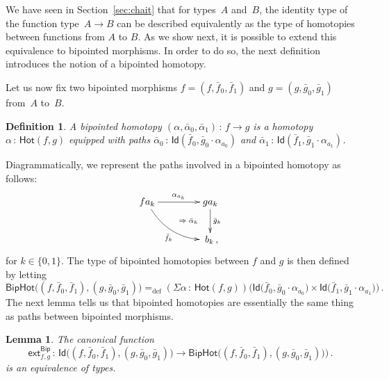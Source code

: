 \documentclass[10pt,a4paper,oneside,reqno]{amsart}
\numberwithin{equation}{section}
\theoremstyle{mythm}
\newtheorem{lemma}[theorem]{Lemma}
\theoremstyle{mydef}
\newtheorem{definition}[theorem]{Definition}
\theoremstyle{myrmk}
\newcommand{\defeq}{=_{\mathrm{def}}}
\newcommand{\co}{\,{:}\,}
\newcommand{\ct}{\cdot}
\newcommand{\Hot}{\mathsf{Hot}}
\newcommand{\ext}{\mathsf{ext}}
\newcommand{\Id}{\mathsf{Id}}
\newcommand{\Bip}{\mathsf{Bip}}
\newcommand{\BipHot}{\mathsf{BipHot}}
\begin{document}
We have seen in Section~\ref{sec:chait} that for types~$A$ and~$B$, the identity type of the function
 type~$A \to B$ can be described equivalently as the type of homotopies between functions from $A$ to $B$. As
we show next, it is possible to extend this equivalence to bipointed morphisms. In order to do so, the next definition  introduces the notion of a bipointed homotopy. 


\medskip

Let us now fix two bipointed morphisms $f = (f, \bar{f}_0, \bar{f}_1)$ and $g = (g, \bar{g}_0, \bar{g}_1)$ from~$A$
to~$B$.


\begin{definition} \label{thm:biphomotopy} A \emph{bipointed homotopy} 
$(\alpha, \bar{\alpha}_0, \bar{\alpha}_1) \co f \to  g$
is a homotopy~$\alpha \co  \Hot(f, g)$ equipped with paths
$\bar{\alpha}_0 \co \Id(  \bar{f}_0 ,  \bar{g}_0 \ct \alpha_{a_0}  )$ and $\bar{\alpha}_1 \co \Id(
\bar{f}_1 , \bar{g}_1 \ct  \alpha_{a_1})$. 
\end{definition}

Diagrammatically, we represent the paths  involved in a bipointed homotopy as follows:
\[
\xymatrix@C=1.5cm{
f a_k  \ar[r]^{\alpha_{a_k}}  \ar@/_1pc/[dr]_{\bar{f}_k}  
\ar@{}[dr]|{\qquad \Rightarrow \; \bar{\alpha}_k}  & g a_k \ar[d]^{\bar{g}_k}  \\ 
 & \; b_k  \, ,}
  \] 
  for $k \in \{ 0, 1 \}$. The type of bipointed homotopies between $f$ and $g$ is then defined by letting
\[
 \BipHot  \big( (f,\bar{f}_0, \bar{f}_1), (g, \bar{g}_0, \bar{g}_1) \big)   \defeq   
 (\Sigma \alpha \co \Hot( f , g)) \big( 
  \Id\big( \bar{f}_0 ,   \bar{g}_0 \ct \alpha_{a_0}   \big) \times 
  \Id \big( \bar{f}_1,    \bar{g}_1 \ct \alpha_{a_1}  \big) \big) \, .
\]
The next lemma tells us that bipointed homotopies are essentially the
same thing as paths between bipointed morphisms.


\begin{lemma} \label{BoolHomSpace} 
The canonical  function 
\[
\ext^{\Bip}_{f,g} \co \Id \big( (f, \bar{f}_0, \bar{f}_1), (g, \bar{g}_0, \bar{g}_1) \big) \to 
\BipHot\big( (f, \bar{f}_0, \bar{f}_1), (g, \bar{g}_0, \bar{g}_1) ) \big) \, .
\]
is an equivalence of types.
\end{lemma}
\end{document}
